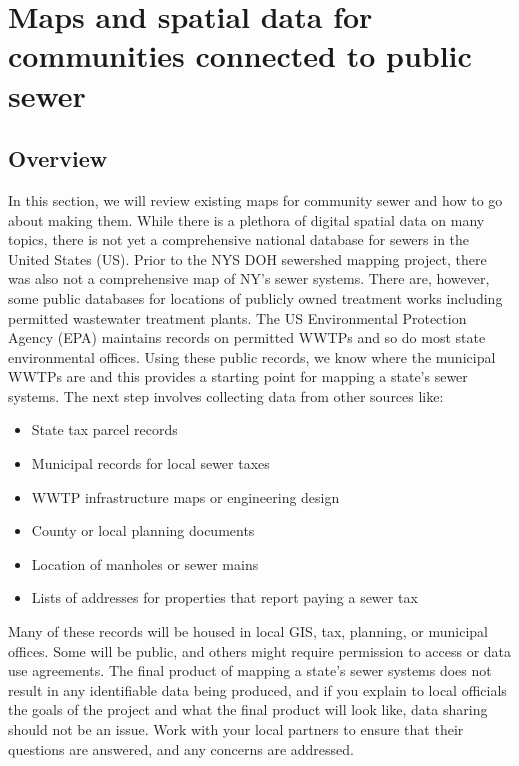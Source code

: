 \documentclass[
]{book}
\providecommand{\tightlist}{%
  \setlength{\itemsep}{0pt}\setlength{\parskip}{0pt}}
\begin{document}
\hypertarget{maps-and-spatial-data-for-communities-connected-to-public-sewer}{%
\chapter{Maps and spatial data for communities connected to public sewer}\label{maps-and-spatial-data-for-communities-connected-to-public-sewer}}

\hypertarget{overview}{%
\section{Overview}\label{overview}}

In this section, we will review existing maps for community sewer and how to go about making them. While there is a plethora of digital spatial data on many topics, there is not yet a comprehensive national database for sewers in the United States (US). Prior to the NYS DOH sewershed mapping project, there was also not a comprehensive map of NY's sewer systems. There are, however, some public databases for locations of publicly owned treatment works including permitted wastewater treatment plants. The US Environmental Protection Agency (EPA) maintains records on permitted WWTPs and so do most state environmental offices. Using these public records, we know where the municipal WWTPs are and this provides a starting point for mapping a state's sewer systems. The next step involves collecting data from other sources like:

\begin{itemize}
\tightlist
\item
  State tax parcel records
\item
  Municipal records for local sewer taxes
\item
  WWTP infrastructure maps or engineering design
\item
  County or local planning documents
\item
  Location of manholes or sewer mains
\item
  Lists of addresses for properties that report paying a sewer tax
\end{itemize}

Many of these records will be housed in local GIS, tax, planning, or municipal offices. Some will be public, and others might require permission to access or data use agreements. The final product of mapping a state's sewer systems does not result in any identifiable data being produced, and if you explain to local officials the goals of the project and what the final product will look like, data sharing should not be an issue. Work with your local partners to ensure that their questions are answered, and any concerns are addressed.
\end{document}
